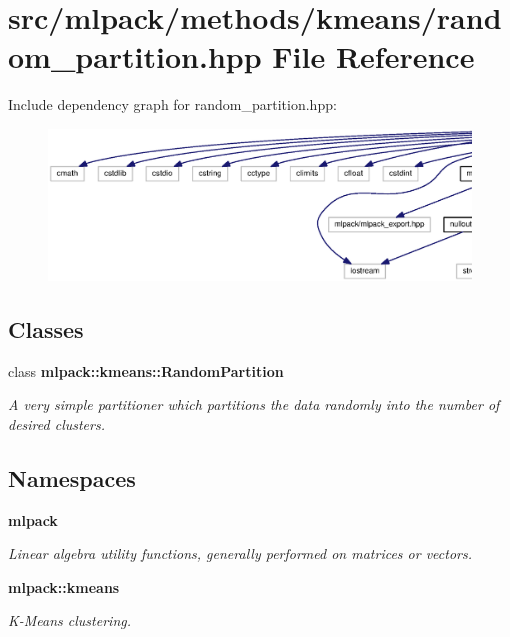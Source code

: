 \section{src/mlpack/methods/kmeans/random\+\_\+partition.hpp File Reference}
\label{random__partition_8hpp}
Include dependency graph for random\+\_\+partition.\+hpp\+:
\nopagebreak
\begin{figure}[H]
\begin{center}
\leavevmode
\includegraphics[width=350pt]{random__partition_8hpp__incl}
\end{center}
\end{figure}
\subsection*{Classes}
\begin{DoxyCompactItemize}
\item 
class {\bf mlpack\+::kmeans\+::\+Random\+Partition}
\begin{DoxyCompactList}\small\item\em A very simple partitioner which partitions the data randomly into the number of desired clusters. \end{DoxyCompactList}\end{DoxyCompactItemize}
\subsection*{Namespaces}
\begin{DoxyCompactItemize}
\item 
 {\bf mlpack}
\begin{DoxyCompactList}\small\item\em Linear algebra utility functions, generally performed on matrices or vectors. \end{DoxyCompactList}\item 
 {\bf mlpack\+::kmeans}
\begin{DoxyCompactList}\small\item\em K-\/\+Means clustering. \end{DoxyCompactList}\end{DoxyCompactItemize}


